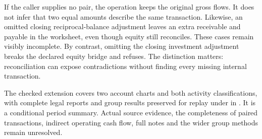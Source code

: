 If the caller supplies no pair, the operation keeps the original gross flows.
It does not infer that two equal amounts describe the same transaction.
Likewise, an omitted closing reciprocal-balance adjustment leaves an extra
receivable and payable in the worksheet, even though equity still reconciles.
These cases remain visibly incomplete. By contrast, omitting the closing
investment adjustment breaks the declared equity bridge and refuses. The
distinction matters: reconciliation can expose contradictions without finding
every missing internal transaction.

The checked extension covers two account charts and both activity
classifications, with complete legal reports and group results preserved for
replay under  in
. It is a conditional period summary.
Actual source evidence, the completeness of paired transactions, indirect
operating cash flow, full notes and the wider group methods remain unresolved.

